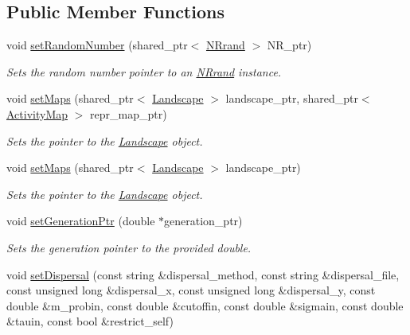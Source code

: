 \subsection*{Public Member Functions}
\begin{DoxyCompactItemize}
\item 
void \hyperlink{class_dispersal_coordinator_a921c3a830d5cd1663f702932874420d2}{set\+Random\+Number} (shared\+\_\+ptr$<$ \hyperlink{class_n_rrand}{N\+Rrand} $>$ N\+R\+\_\+ptr)
\begin{DoxyCompactList}\small\item\em Sets the random number pointer to an \hyperlink{class_n_rrand}{N\+Rrand} instance. \end{DoxyCompactList}\item 
void \hyperlink{class_dispersal_coordinator_a7564bbc5e1d03f5a6f1e268c5c6db5aa}{set\+Maps} (shared\+\_\+ptr$<$ \hyperlink{class_landscape}{Landscape} $>$ landscape\+\_\+ptr, shared\+\_\+ptr$<$ \hyperlink{class_activity_map}{Activity\+Map} $>$ repr\+\_\+map\+\_\+ptr)
\begin{DoxyCompactList}\small\item\em Sets the pointer to the \hyperlink{class_landscape}{Landscape} object. \end{DoxyCompactList}\item 
void \hyperlink{class_dispersal_coordinator_a854e8a4c31ae301721c38e4f8581fe83}{set\+Maps} (shared\+\_\+ptr$<$ \hyperlink{class_landscape}{Landscape} $>$ landscape\+\_\+ptr)
\begin{DoxyCompactList}\small\item\em Sets the pointer to the \hyperlink{class_landscape}{Landscape} object. \end{DoxyCompactList}\item 
void \hyperlink{class_dispersal_coordinator_aad9a57afe4629674c958e4d0de4d2451}{set\+Generation\+Ptr} (double $\ast$generation\+\_\+ptr)
\begin{DoxyCompactList}\small\item\em Sets the generation pointer to the provided double. \end{DoxyCompactList}\item 
void \hyperlink{class_dispersal_coordinator_a977652ff40148fa7e0a0bfff049b9568}{set\+Dispersal} (const string \&dispersal\+\_\+method, const string \&dispersal\+\_\+file, const unsigned long \&dispersal\+\_\+x, const unsigned long \&dispersal\+\_\+y, const double \&m\+\_\+probin, const double \&cutoffin, const double \&sigmain, const double \&tauin, const bool \&restrict\+\_\+self)

\end{DoxyCompactItemize}
